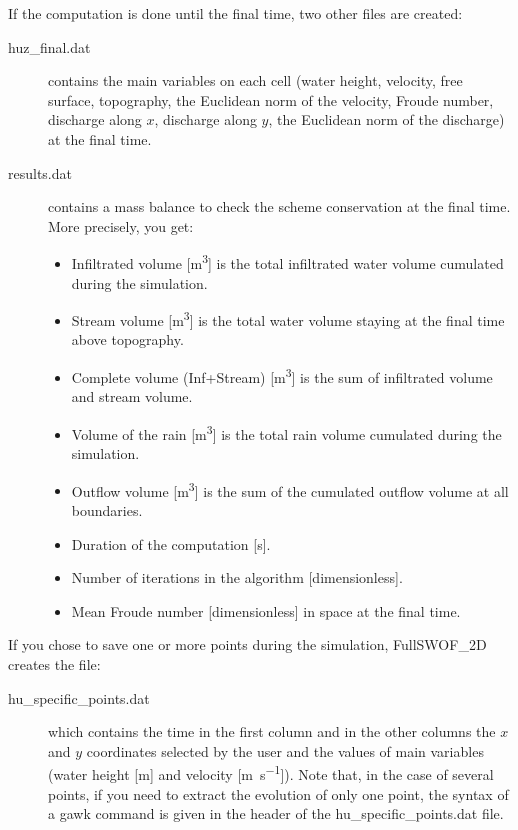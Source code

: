 \documentclass[a4paper, 11pt]{article}
\newcommand{\FullSWOF}{FullSWOF\_2D}
\begin{document}
\medskip

If the computation is done until the final time, two other files are created:
\begin{description}
	\item[\textsf{huz\_final.dat}] contains the main variables on each cell (water height, velocity, free surface, topography, the Euclidean norm of the velocity, Froude number, discharge along \(x\), discharge along \(y\), the Euclidean norm of the discharge) at the final time.
	\item[\textsf{results.dat}] contains a mass balance to check the scheme conservation at the final time.
	      More precisely, you get:
	      \begin{itemize}
		      \item Infiltrated volume [\si{\cubic\meter}] is the total infiltrated water volume cumulated during the simulation.
		      \item Stream volume [\si{\cubic\meter}] is the total water volume staying at the final time above topography.
		      \item Complete volume (Inf+Stream) [\si{\cubic\meter}] is the sum of infiltrated volume and stream volume.
		      \item Volume of the rain [\si{\cubic\meter}] is the total rain volume cumulated during the simulation.
		      \item Outflow volume [\si{\cubic\meter}] is the sum of the cumulated outflow volume at all boundaries.
		      \item Duration of the computation [\si{\second}].
		      \item Number of iterations in the algorithm [\si{dimensionless}].
		      \item Mean Froude number [\si{dimensionless}] in space at the final time.
	      \end{itemize}
\end{description}

\medskip

If you chose to save one or more points during the simulation, \FullSWOF{} creates the file:
\begin{description}
	\item[\textsf{hu\_specific\_points.dat}] which contains the time in the first column and in the other columns the \(x\) and \(y\) coordinates selected by the user and the values of main variables (water height [\si{\meter}] and velocity [\si{\meter\per\second}]).\newline
	      Note that, in the case of several points, if you need to extract the evolution of only one point, the syntax of a \textsf{gawk} command is given in the header of the \textsf{hu\_specific\_points.dat} file.
\end{description}
\end{document}
